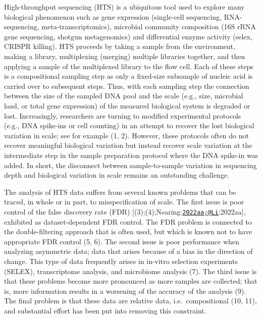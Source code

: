 \documentclass[
]{article}
\begin{document}
High-throughput sequencing (HTS) is a ubiquitous tool used to explore
many biological phenomenon such as gene expression (single-cell
sequencing, RNA-sequencing, meta-transcriptomics), microbial community
composition (16S rRNA gene sequencing, shotgun metagenomics) and
differential enzyme activity (selex, CRISPR killing). HTS proceeds by
taking a sample from the environment, making a library, multiplexing
(merging) multiple libraries together, and then applying a sample of the
multiplexed library to the flow cell. Each of these steps is a
compositional sampling step as only a fixed-size subsample of nucleic
acid is carried over to subsequent steps. Thus, with each sampling step
the connection between the size of the sampled DNA pool and the scale
(e.g., size, microbial load, or total gene expression) of the measured
biological system is degraded or lost. Increasingly, researchers are
turning to modified experimental protocols (e.g., DNA spike-ins or cell
counting) in an attempt to recover the lost biological variation in
scale; see for example (1, 2). However, these protocols often do not
recover meaningful biological variation but instead recover scale
variation at the intermediate step in the sample preparation protocol
where the DNA spike-in was added. In short, the disconnect between
sample-to-sample variation in sequencing depth and biological variation
in scale remains an outstanding challenge.

The analysis of HTS data suffers from several known problems that can be
traced, in whole or in part, to misspecification of scale. The first
issue is poor control of the false discovery rate (FDR)
{[}(3);(4);Nearing:\href{mailto:2022aa;@Li}{\nolinkurl{2022aa;@Li}}:2022aa{]},
exhibited as dataset-dependent FDR control. The FDR problem is connected
to the double-filtering approach that is often used, but which is known
not to have appropriate FDR control (5, 6). The second issue is poor
performance when analyzing asymmetric data; data that arises because of
a bias in the direction of change. This type of data frequently arises
in in-vitro selection experiments (SELEX), transcriptome analysis, and
microbiome analysis (7). The third issue is that these problems become
more pronounced as more samples are collected; that is, more information
results in a worsening of the accuracy of the analysis (9). The final
problem is that these data are relative data, i.e.~compositional (10,
11), and substantial effort has been put into removing this constraint.
\end{document}
